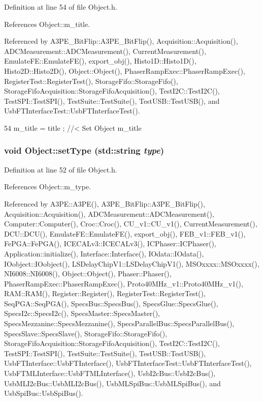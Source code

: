 Definition at line 54 of file Object.h.

References Object::m\_\-title.

Referenced by A3PE\_\-BitFlip::A3PE\_\-BitFlip(), Acquisition::Acquisition(), ADCMeasurement::ADCMeasurement(), CurrentMeasurement(), EmulateFE::EmulateFE(), export\_\-obj(), Histo1D::Histo1D(), Histo2D::Histo2D(), Object::Object(), PhaserRampExec::PhaserRampExec(), RegisterTest::RegisterTest(), StorageFifo::StorageFifo(), StorageFifoAcquisition::StorageFifoAcquisition(), TestI2C::TestI2C(), TestSPI::TestSPI(), TestSuite::TestSuite(), TestUSB::TestUSB(), and UsbFTInterfaceTest::UsbFTInterfaceTest().


\begin{DoxyCode}
54 { m_title = title ; } //< Set Object m_title
\end{DoxyCode}
\hypertarget{classObject_aae534cc9d982bcb9b99fd505f2e103a5}{
\subsubsection[{setType}]{\setlength{\rightskip}{0pt plus 5cm}void Object::setType (std::string {\em type})}}
\label{classObject_aae534cc9d982bcb9b99fd505f2e103a5}


Definition at line 52 of file Object.h.

References Object::m\_\-type.

Referenced by A3PE::A3PE(), A3PE\_\-BitFlip::A3PE\_\-BitFlip(), Acquisition::Acquisition(), ADCMeasurement::ADCMeasurement(), Computer::Computer(), Croc::Croc(), CU\_\-v1::CU\_\-v1(), CurrentMeasurement(), DCU::DCU(), EmulateFE::EmulateFE(), export\_\-obj(), FEB\_\-v1::FEB\_\-v1(), FePGA::FePGA(), ICECALv3::ICECALv3(), ICPhaser::ICPhaser(), Application::initialize(), Interface::Interface(), IOdata::IOdata(), IOobject::IOobject(), LSDelayChipV1::LSDelayChipV1(), MSOxxxx::MSOxxxx(), NI6008::NI6008(), Object::Object(), Phaser::Phaser(), PhaserRampExec::PhaserRampExec(), Proto40MHz\_\-v1::Proto40MHz\_\-v1(), RAM::RAM(), Register::Register(), RegisterTest::RegisterTest(), SeqPGA::SeqPGA(), SpecsBus::SpecsBus(), SpecsGlue::SpecsGlue(), SpecsI2c::SpecsI2c(), SpecsMaster::SpecsMaster(), SpecsMezzanine::SpecsMezzanine(), SpecsParallelBus::SpecsParallelBus(), SpecsSlave::SpecsSlave(), StorageFifo::StorageFifo(), StorageFifoAcquisition::StorageFifoAcquisition(), TestI2C::TestI2C(), TestSPI::TestSPI(), TestSuite::TestSuite(), TestUSB::TestUSB(), UsbFTInterface::UsbFTInterface(), UsbFTInterfaceTest::UsbFTInterfaceTest(), UsbFTMLInterface::UsbFTMLInterface(), UsbI2cBus::UsbI2cBus(), UsbMLI2cBus::UsbMLI2cBus(), UsbMLSpiBus::UsbMLSpiBus(), and UsbSpiBus::UsbSpiBus().


